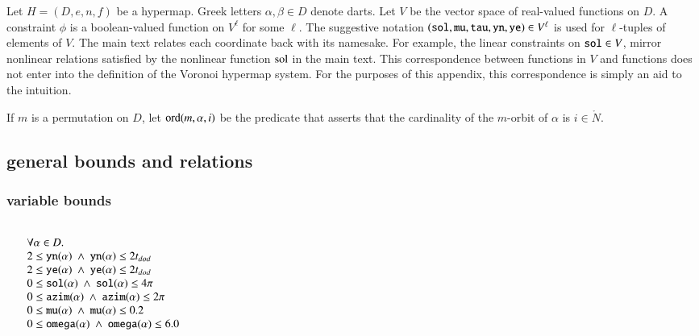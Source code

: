 Let $H=(D,e,n,f)$ be a hypermap.   Greek letters
$\alpha,\beta \in D$ denote darts.  Let $V$ be the vector space 
of real-valued  functions on $D$.  A constraint $\phi$ is a boolean-valued function on $V^\ell$ for some $\ell$.  The suggestive
notation $({\operatorname{{\texttt{sol}}}},{\operatorname{{\texttt{mu}}}},{\operatorname{{\texttt{tau}}}},{\operatorname{{\texttt{yn}}}},{\operatorname{{\texttt{ye}}}})\in V^\ell$  is used for $\ell$-tuples
of elements of $V$.  The main text relates each coordinate back
with its namesake.  For example, the linear constraints on
${\operatorname{{\texttt{sol}}}}\in V$, mirror  nonlinear relations satisfied by the
nonlinear function $\operatorname{sol}$ in the main text.  This correspondence
between functions in $V$ and functions does not enter into the
definition of the Voronoi hypermap system.  For the purposes of this
appendix, this correspondence is simply an aid to the
intuition.

If $m$ is  a permutation on $D$, let ${\operatorname{ord}}(m,\alpha,i)$
be the predicate that asserts that the cardinality of the $m$-orbit
of $\alpha$ is $i\in\ring{N}$.
\bigskip


\subsection{general bounds and relations}\label{sec:lpbounds}


\subsubsection{variable bounds}

$$
\begin{array}{lll}
\leftalign\\
   \forall \alpha\in D.\\
    2 \le \optt{yn}(\alpha) \sland
    \optt{yn}(\alpha) \le 2t_{dod} \\
    2 \le \optt{ye}(\alpha) \sland
    \optt{ye}(\alpha) \le 2t_{dod}\\
   0 \le \optt{sol}(\alpha) \sland
     \optt{sol}(\alpha) \le 4 \pi \\
   0 \le \optt{azim}(\alpha) \sland
     \optt{azim}(\alpha) \le 2\pi \\
   0 \le \optt{mu}(\alpha) \sland
      \optt{mu}(\alpha) \le 0.2 \\
   0 \le \optt{omega}(\alpha) \sland
      \optt{omega}(\alpha) \le 6.0 \\   
\end{array}
$$

